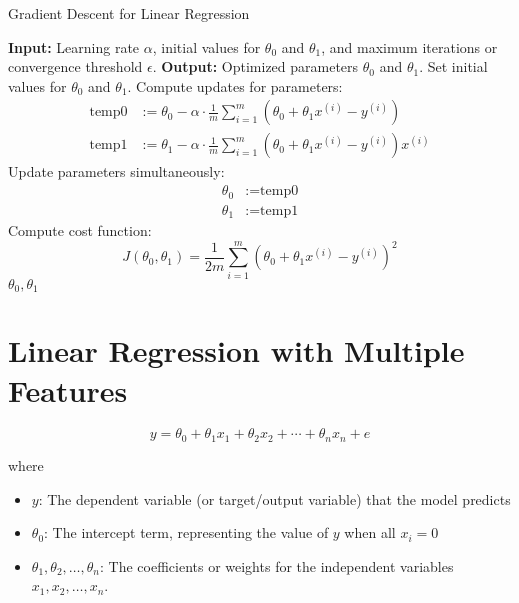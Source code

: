 \begin{algorithm}[h!]
\caption{Gradient Descent for Linear Regression}
\begin{algorithmic}[1]
\STATE \textbf{Input:} Learning rate $\alpha$, initial values for $\theta_0$ and $\theta_1$, and maximum iterations or
convergence threshold $\epsilon$.
\STATE \textbf{Output:} Optimized parameters $\theta_0$ and $\theta_1$.
\STATE Set initial values for $\theta_0$ and $\theta_1$.
\REPEAT
    \STATE Compute updates for parameters:
    \begin{align*}
        \text{temp0} & := \theta_0 - \alpha \cdot \frac{1}{m} \sum_{i=1}^m \left( \theta_0 + \theta_1 x^{(i)} - y^{(i)} \right) \\
        \text{temp1} & := \theta_1 - \alpha \cdot \frac{1}{m} \sum_{i=1}^m \left( \theta_0 + \theta_1 x^{(i)} - y^{(i)} \right) x^{(i)}
    \end{align*}
    \STATE Update parameters simultaneously:
    \begin{align*}
        \theta_0 & := \text{temp0} \\
        \theta_1 & := \text{temp1}
    \end{align*}
    \STATE Compute cost function:
    \[
    J(\theta_0, \theta_1) = \frac{1}{2m} \sum_{i=1}^m \left( \theta_0 + \theta_1 x^{(i)} - y^{(i)} \right)^2
    \]
\RETURN $\theta_0, \theta_1$
\end{algorithmic}
\end{algorithm}

\nocite{*}
\newpage
\section{Linear Regression with Multiple Features}

\begin{equation}
    y = \theta_0 + \theta_1 x_1 + \theta_2 x_2 + \cdots + \theta_n x_n + e
\end{equation}

\noindent where
\begin{itemize}
    \item $y$: The dependent variable (or target/output variable) that the model predicts
    \item $\theta_0$: The intercept term, representing the value of \(y\) when all \(x_i = 0\)
    \item $\theta_1, \theta_2, \dots, \theta_n$: The coefficients or weights for the independent variables
    \(x_1, x_2, \dots, x_n\).
\end{itemize}

